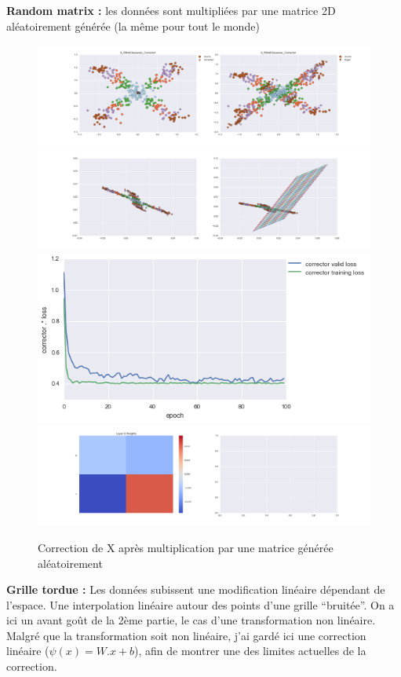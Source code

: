 {\Large \textbf{Random matrix :}} les données sont multipliées par une matrice 2D aléatoirement générée
 (la même pour tout le monde)

\begin{figure}[H] %
\centering
\includegraphics[width=\linewidth]{fig/24-05-2016/X/X_RMatClasswise_Corrector-DATA.png}
\includegraphics[width=\linewidth]{fig/24-05-2016/X/X_RMatClasswise_Corrector-GridCheck.png}
\includegraphics[width=0.45\linewidth]{fig/24-05-2016/X/X_RMatClasswise_Corrector-Learning_curve.png}
\includegraphics[width=\linewidth]{fig/24-05-2016/X/X_RMatClasswise_Corrector-W.png}
\caption{Correction de X après multiplication par une matrice générée aléatoirement}
\label{fig:recap-X-RMat-classwise}
\end{figure}


{\Large \textbf{Grille tordue :}} Les données subissent une modification linéaire dépendant de l'espace.
Une interpolation linéaire autour des points d'une grille ``bruitée''.
On a ici un avant goût de la 2ème partie, le cas d'une transformation non linéaire.
Malgré que la transformation soit non linéaire, j'ai gardé ici une correction linéaire ($\psi(x) = W.x+b$),
afin de montrer une des limites actuelles de la correction.

